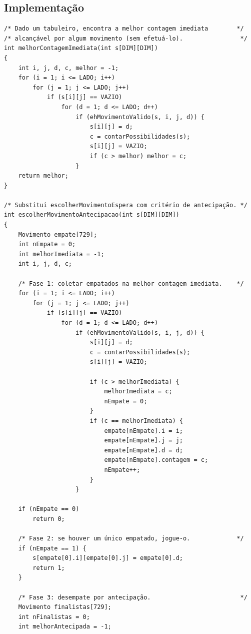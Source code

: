 \documentclass[11pt,a4paper,oneside]{report}
\begin{document}
\subsection{Implementação}

\begin{lstlisting}[caption={Heurística com antecipação de uma jogada.},label={lst:lookahead}]
/* Dado um tabuleiro, encontra a melhor contagem imediata        */
/* alcançável por algum movimento (sem efetuá-lo).                */
int melhorContagemImediata(int s[DIM][DIM])
{
    int i, j, d, c, melhor = -1;
    for (i = 1; i <= LADO; i++)
        for (j = 1; j <= LADO; j++)
            if (s[i][j] == VAZIO)
                for (d = 1; d <= LADO; d++)
                    if (ehMovimentoValido(s, i, j, d)) {
                        s[i][j] = d;
                        c = contarPossibilidades(s);
                        s[i][j] = VAZIO;
                        if (c > melhor) melhor = c;
                    }
    return melhor;
}

/* Substitui escolherMovimentoEspera com critério de antecipação. */
int escolherMovimentoAntecipacao(int s[DIM][DIM])
{
    Movimento empate[729];
    int nEmpate = 0;
    int melhorImediata = -1;
    int i, j, d, c;

    /* Fase 1: coletar empatados na melhor contagem imediata.    */
    for (i = 1; i <= LADO; i++)
        for (j = 1; j <= LADO; j++)
            if (s[i][j] == VAZIO)
                for (d = 1; d <= LADO; d++)
                    if (ehMovimentoValido(s, i, j, d)) {
                        s[i][j] = d;
                        c = contarPossibilidades(s);
                        s[i][j] = VAZIO;

                        if (c > melhorImediata) {
                            melhorImediata = c;
                            nEmpate = 0;
                        }
                        if (c == melhorImediata) {
                            empate[nEmpate].i = i;
                            empate[nEmpate].j = j;
                            empate[nEmpate].d = d;
                            empate[nEmpate].contagem = c;
                            nEmpate++;
                        }
                    }

    if (nEmpate == 0)
        return 0;

    /* Fase 2: se houver um único empatado, jogue-o.             */
    if (nEmpate == 1) {
        s[empate[0].i][empate[0].j] = empate[0].d;
        return 1;
    }

    /* Fase 3: desempate por antecipação.                         */
    Movimento finalistas[729];
    int nFinalistas = 0;
    int melhorAntecipada = -1;


\end{lstlisting}
\end{document}
